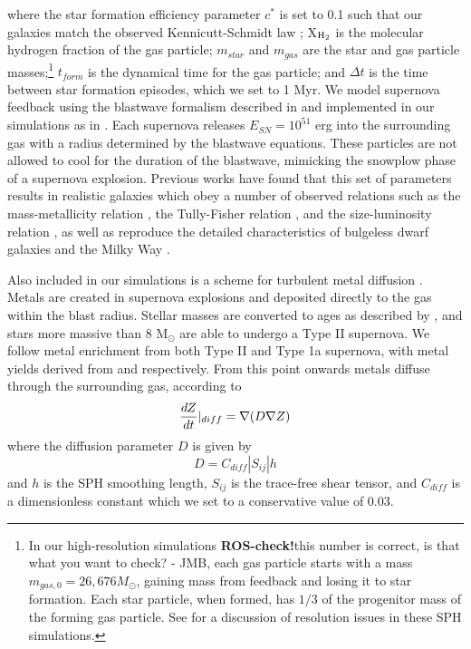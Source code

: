 \documentclass[nofootinbib,twocolumn,prd]{emulateapj}
\newcommand\jillianremark[1]{{\color{blue}#1}}
\begin{document}
\noindent
where the star formation efficiency parameter $c^*$ is set to 0.1 such
that our galaxies match the observed Kennicutt-Schmidt law
\citep{1989ApJ...344..685K};  X$_{\rm H_2}$ is the molecular hydrogen fraction of the gas particle; $m_{star}$ and $m_{gas}$ are the star and gas
particle masses;\footnote{In our high-resolution simulations \textbf{ROS-check!}\jillianremark{this number is correct, is that what you want to check? - JMB}, each gas particle starts with a mass
  $m_{gas,0}=26,676 M_\odot$, gaining mass from feedback and losing it to star formation.  Each star particle, when
  formed, has $1/3$ of the progenitor mass of the forming gas particle.  See \cite{2010ApJ...717..121C} for a discussion
of resolution issues in these SPH simulations.} $t_{form}$ is the dynamical time for the gas
particle; and $\Delta t$ is the time between star formation episodes,
which we set to 1 Myr.  We model supernova feedback using the
blastwave formalism described in \citet{1977ApJ...218..148M} and implemented in
our simulations as in \citet{Stinson06}.  Each supernova releases
$E_{SN} = 10^{51}$ erg into the surrounding gas with a radius
determined by the blastwave equations.  These particles are not
allowed to cool for the duration of the blastwave, mimicking the
snowplow phase of a supernova explosion.  Previous works have found
that this set of parameters results in realistic galaxies which obey a
number of observed relations such as the mass-metallicity relation
\citep{Brooks07}, the Tully-Fisher relation \citep{Governato09}, and
the size-luminosity relation \citep{Brooks11}, as well as reproduce
the detailed characteristics of bulgeless dwarf galaxies
\citep{Governato10} and the Milky Way \citep{2011ApJ...742...76G}.


Also included in our simulations is a scheme for turbulent metal
diffusion \citep{Shen10}.  Metals are created in supernova explosions
and deposited directly to the gas within the blast radius.  Stellar
masses are converted to ages as described by \citet{1996A&A...315..105R}, and
stars more massive than 8 M$_\odot$ are able to undergo a Type II
supernova.  We follow metal enrichment from both Type II and Type 1a
supernova, with metal yields derived from \citet{Weaver93} and
\citet{Thielemann86} respectively.  From this point onwards metals
diffuse through the surrounding gas, according to 
\begin{equation}
\frac{dZ}{dt}|_{diff} = \nabla (D \nabla {Z}) \\
\end{equation}
%
where the diffusion parameter $D$ is given by
%
\begin{equation}
D = C_{diff} |S_{ij}| h
\end{equation}
%
and $h$ is the SPH smoothing length, $S_{ij}$ is the trace-free shear
tensor, and $C_{diff}$ is a dimensionless constant which we set to a conservative value of 0.03.  
\end{document}

